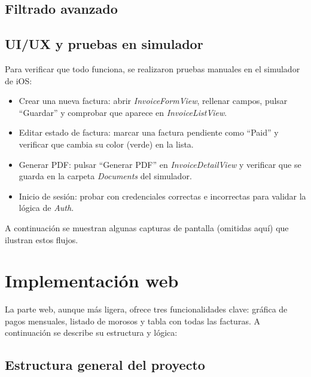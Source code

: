 \subsection{Filtrado avanzado}

\subsection{UI/UX y pruebas en simulador}

\begin{large}

Para verificar que todo funciona, se realizaron pruebas manuales en el simulador de iOS:

\begin{itemize}
  \item Crear una nueva factura: abrir \textit{InvoiceFormView}, rellenar campos, pulsar “Guardar” y comprobar que aparece en \textit{InvoiceListView}.
  \item Editar estado de factura: marcar una factura pendiente como “Paid” y verificar que cambia su color (verde) en la lista.
  \item Generar PDF: pulsar “Generar PDF” en \textit{InvoiceDetailView} y verificar que se guarda en la carpeta \emph{Documents} del simulador.
  \item Inicio de sesión: probar con credenciales correctas e incorrectas para validar la lógica de \textit{Auth}.
\end{itemize}

A continuación se muestran algunas capturas de pantalla (omitidas aquí) que ilustran estos flujos.

\end{large}

\section{Implementación web}

\begin{large}

La parte web, aunque más ligera, ofrece tres funcionalidades clave: gráfica de pagos mensuales, listado de morosos y tabla con todas las facturas. A continuación se describe su estructura y lógica:

\end{large}

\subsection{Estructura general del proyecto}

